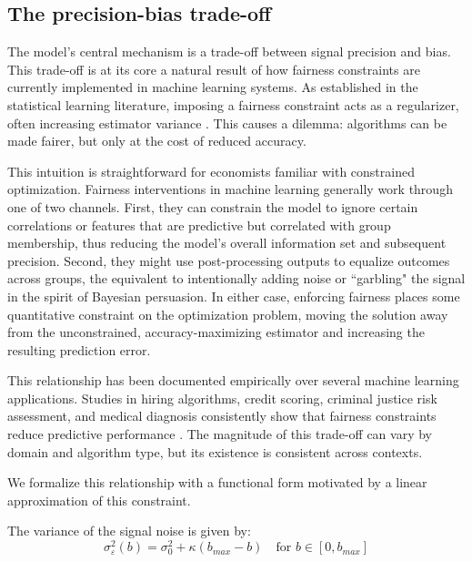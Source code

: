 \subsection{The precision-bias trade-off}
The model's central mechanism is a trade-off between signal precision and bias. This trade-off is at its core a natural result of how fairness constraints are currently implemented in machine learning systems. As established in the statistical learning literature, imposing a fairness constraint acts as a regularizer, often increasing estimator variance \citep{Kamishima2012, Wick2019}. This causes a dilemma: algorithms can be made fairer, but only at the cost of reduced accuracy.

This intuition is straightforward for economists familiar with constrained optimization. Fairness interventions in machine learning generally work through one of two channels. First, they can constrain the model to ignore certain correlations or features that are predictive but correlated with group membership, thus reducing the model's overall information set and subsequent precision. Second, they might use post-processing outputs to equalize outcomes across groups, the equivalent to intentionally adding noise or ``garbling" the signal in the spirit of Bayesian persuasion. In either case, enforcing fairness places some quantitative constraint on the optimization problem, moving the solution away from the unconstrained, accuracy-maximizing estimator and increasing the resulting prediction error.

This relationship has been documented empirically over several machine learning applications. Studies in hiring algorithms, credit scoring, criminal justice risk assessment, and medical diagnosis consistently show that fairness constraints reduce predictive performance \citep{Kleinberg2017, Chouldechova2017}. The magnitude of this trade-off can vary by domain and algorithm type, but its existence is consistent across contexts.

We formalize this relationship with a functional form motivated by a linear approximation of this constraint.

\begin{definition}
The variance of the signal noise is given by:
\begin{equation}
\sigma_\varepsilon^2(b) = \sigma_0^2 + \kappa(b_{max} - b) \quad \text{for } b \in [0, b_{max}]
\end{equation}
\end{definition}

